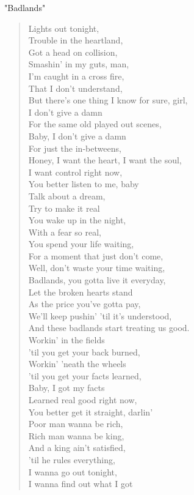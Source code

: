 "Badlands"
\begin{verse}
Lights out tonight,\\
Trouble in the heartland,\\
Got a head on collision,\\
Smashin' in my guts, man,\\
I'm caught in a cross fire,\\
That I don't understand,\\
But there's one thing I know for sure, girl,\\
I don't give a damn\\
For the same old played out scenes,\\
Baby, I don't give a damn\\
For just the in-betweens,\\
Honey, I want the heart, I want the soul,\\
I want control right now,\\
You better listen to me, baby\\

Talk about a dream,\\
Try to make it real\\
You wake up in the night,\\
With a fear so real,\\
You spend your life waiting,\\
For a moment that just don't come,\\
Well, don't waste your time waiting,\\

Badlands, you gotta live it everyday,\\
Let the broken hearts stand\\
As the price you've gotta pay,\\
We'll keep pushin' 'til it's understood,\\
And these badlands start treating us good.\\

Workin' in the fields\\
'til you get your back burned,\\
Workin' 'neath the wheels\\
'til you get your facts learned,\\
Baby, I got my facts\\
Learned real good right now,\\
You better get it straight, darlin'\\
Poor man wanna be rich,\\
Rich man wanna be king,\\
And a king ain't satisfied,\\
'til he rules everything,\\
I wanna go out tonight,\\
I wanna find out what I got\\


\end{verse}
